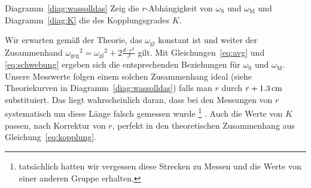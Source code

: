 Diagramm~\ref{diag:wassolldas} Zeig die $r$-Abhängigkeit von $\omega_\mathrm{S}$ und $\omega_\mathrm{M}$ und Diagramm~\ref{diag:K} die des Kopplungsgrades $K$.

Wir erwarten gemäß der Theorie, das $\omega_\mathrm{gl}$ konstant ist und weiter der Zusammenhand ${\omega_\mathrm{geg}}^2 = {\omega_\mathrm{gl}}^2 + 2 \frac{d \cdot r^2}{J}$ gilt. Mit Gleichungen~\ref{eq:avg} und \ref{eq:schwebung} ergeben sich die entsprechenden Beziehungen für $\omega_\mathrm{S}$ und $\omega_\mathrm{M}$. Unsere Messwerte folgen einem solchen Zusammenhang ideal (siehe Theoriekurven in Diagramm~\ref{diag:wassolldas}) falls man $r$ durch $r + \unit[1.3]{cm}$ substituiert. Das liegt wahrscheinlich daran, dass bei den Messungen von $r$ systematisch um diese Länge falsch gemessen wurde%
\footnote{tatsächlich hatten wir vergessen diese Strecken zu Messen und die Werte von einer anderen Gruppe erhalten.}%
.
Auch die Werte von $K$ passen, nach Korrektur von $r$, perfekt in den theoretischen Zusammenhang aus Gleichung~\ref{eq:kopplung}.














